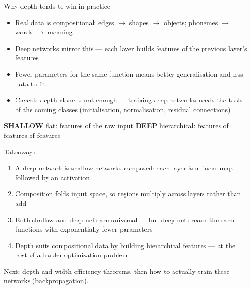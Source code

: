 \documentclass[aspectratio=169, 11pt]{beamer}
\newcommand{\shpar}[2]{%
  \vfill
  {\footnotesize
  \begin{tcolorbox}[enhanced, sidebyside, sidebyside align=top,
                    lefthand ratio=0.485,
                    segmentation style={shc!35, line width=0.6pt},
                    colback=shc!5, colframe=shc!35, boxrule=0.5pt,
                    arc=1.5mm, left=2mm, right=2mm, top=0.8mm, bottom=0.8mm]
    {\color{shc}\textbf{SHALLOW}}\;\; #1
  \tcblower
    {\color{dpc}\textbf{DEEP}}\;\; #2
  \end{tcolorbox}}%
  \vspace{0.6em}%
}
\begin{document}
\begin{frame}{Why depth tends to win in practice}
  \begin{itemize}
    \item Real data is \alert{compositional}: edges $\to$
          shapes $\to$ objects; phonemes $\to$ words $\to$
          meaning
    \item Deep networks mirror this --- each layer builds
          \alert{features of the previous layer's features}
    \item Fewer parameters for the same function means
          \alert{better generalisation} and less data to fit
    \item Caveat: depth alone is not enough --- training deep
          networks needs the tools of the coming classes
          (initialisation, normalisation, residual
          connections)
  \end{itemize}
  \shpar{flat: features of the raw input}
        {hierarchical: features of features of features}
\end{frame}

\begin{frame}{Takeaways}
  \begin{enumerate}\setlength{\itemsep}{2pt}
    \item A \alert{deep network} is shallow networks
          \alert{composed}: each layer is a linear map
          followed by an activation
    \item Composition \alert{folds} input space, so regions
          \alert{multiply} across layers rather than add
    \item Both shallow and deep nets are universal ---
          but deep nets reach the same functions with
          \alert{exponentially fewer parameters}
    \item Depth suits \alert{compositional} data by building
          hierarchical features --- at the cost of a harder
          optimisation problem
  \end{enumerate}
  \vspace{0.3em}
  \begin{redhighlight}
    Next: depth and width efficiency theorems, then how to
    actually \alert{train} these networks (backpropagation).
  \end{redhighlight}
\end{frame}
\end{document}

